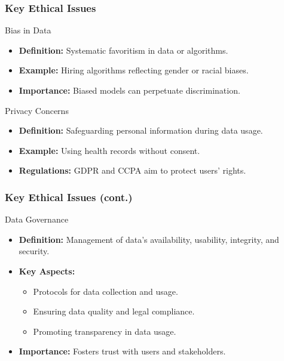 \documentclass[aspectratio=169]{beamer}
\begin{document}
\begin{frame}[fragile]
    \frametitle{Key Ethical Issues}
    \begin{block}{Bias in Data}
        \begin{itemize}
            \item \textbf{Definition:} Systematic favoritism in data or algorithms.
            \item \textbf{Example:} Hiring algorithms reflecting gender or racial biases.
            \item \textbf{Importance:} Biased models can perpetuate discrimination.
        \end{itemize}
    \end{block}

    \begin{block}{Privacy Concerns}
        \begin{itemize}
            \item \textbf{Definition:} Safeguarding personal information during data usage.
            \item \textbf{Example:} Using health records without consent.
            \item \textbf{Regulations:} GDPR and CCPA aim to protect users' rights.
        \end{itemize}
    \end{block}
\end{frame}

\begin{frame}[fragile]
    \frametitle{Key Ethical Issues (cont.)}
    \begin{block}{Data Governance}
        \begin{itemize}
            \item \textbf{Definition:} Management of data’s availability, usability, integrity, and security.
            \item \textbf{Key Aspects:}
            \begin{itemize}
                \item Protocols for data collection and usage.
                \item Ensuring data quality and legal compliance.
                \item Promoting transparency in data usage.
            \end{itemize}
            \item \textbf{Importance:} Fosters trust with users and stakeholders.
        \end{itemize}
    \end{block}
\end{frame}
\end{document}
